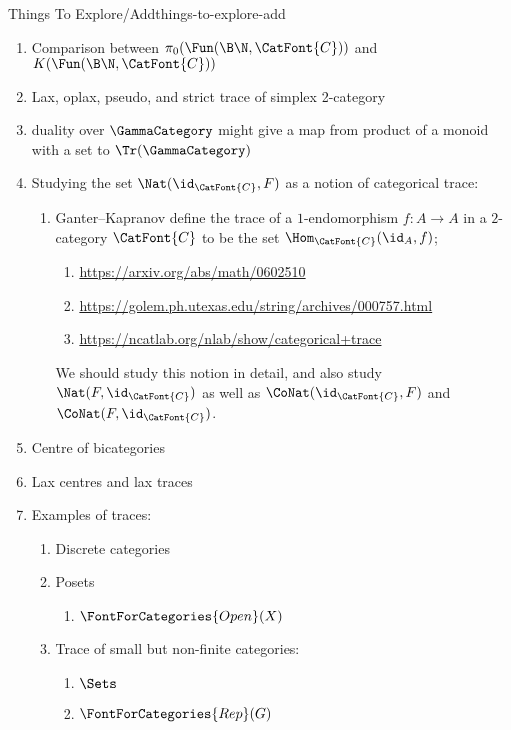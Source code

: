 \begin{remark}{Things To Explore/Add}{things-to-explore-add}
\begin{enumerate}
        \item Comparison between $\pi_{0}(\Fun(\B\N,\CatFont{C}))$ and $K(\Fun(\B\N,\CatFont{C}))$
        \item Lax, oplax, pseudo, and strict trace of simplex 2-category
        \item duality over $\GammaCategory$ might give a map from product of a monoid with a set to $\Tr(\GammaCategory)$
        \item Studying the set $\Nat(\id_{\CatFont{C}},F)$ as a notion of categorical trace:
            \begin{enumerate}
                \item Ganter–Kapranov define the trace of a $1$-endomorphism $f\colon A\to A$ in a $2$-category $\CatFont{C}$ to be the set $\Hom_{\CatFont{C}}(\id_{A},f)$;
                    \begin{enumerate}
                        \item \url{https://arxiv.org/abs/math/0602510}
                        \item \url{https://golem.ph.utexas.edu/string/archives/000757.html}
                        \item \url{https://ncatlab.org/nlab/show/categorical+trace}
                    \end{enumerate}
                    We should study this notion in detail, and also study $\Nat(F,\id_{\CatFont{C}})$ as well as $\CoNat(\id_{\CatFont{C}},F)$ and $\CoNat(F,\id_{\CatFont{C}})$.
            \end{enumerate}
        \item Centre of bicategories
        \item Lax centres and lax traces
        \item Examples of traces:
            \begin{enumerate}
                \item Discrete categories
                \item Posets
                    \begin{enumerate}
                        \item $\FontForCategories{Open}(X)$
                    \end{enumerate}
                \item Trace of small but non-finite categories:
                    \begin{enumerate}
                        \item $\Sets$
                        \item $\FontForCategories{Rep}(G)$

\end{enumerate}
\end{enumerate}
\end{enumerate}
\end{remark}
